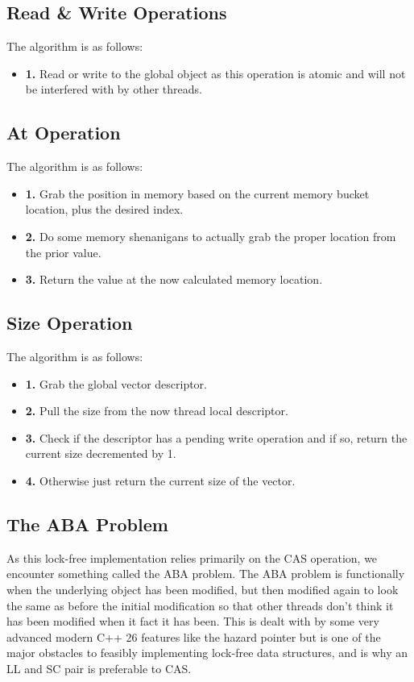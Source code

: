 \documentclass{article}
\begin{document}
\subsection*{Read \& Write Operations}
The algorithm is as follows:
\begin{itemize}
    \item \textbf{1.} Read or write to the global object as this operation is atomic and will not be interfered with by other threads.
\end{itemize}

\subsection*{At Operation}
The algorithm is as follows:
\begin{itemize}
    \item \textbf{1.} Grab the position in memory based on the current memory bucket location, plus the desired index.
    \item \textbf{2.} Do some memory shenanigans to actually grab the proper location from the prior value.
    \item \textbf{3.} Return the value at the now calculated memory location.
\end{itemize}

\subsection*{Size Operation}
The algorithm is as follows:
\begin{itemize}
    \item \textbf{1.} Grab the global vector descriptor.
    \item \textbf{2.} Pull the size from the now thread local descriptor.
    \item \textbf{3.} Check if the descriptor has a pending write operation and if so, return the current size decremented by 1.
    \item \textbf{4.} Otherwise just return the current size of the vector.
\end{itemize}

\subsection*{The ABA Problem}
As this lock-free implementation relies primarily on the CAS operation, we encounter something called the ABA problem. The ABA problem is functionally when the underlying object has been modified, but then modified again to look the same as before the initial modification so that other threads don't think it has been modified when it fact it has been. This is dealt with by some very advanced modern C++ 26 features like the hazard pointer but is one of the major obstacles to feasibly implementing lock-free data structures, and is why an LL and SC pair is preferable to CAS.
\end{document}
